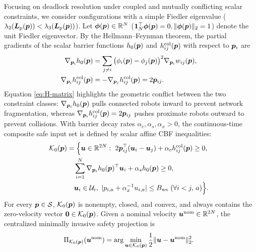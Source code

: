 Focusing on deadlock resolution under coupled and mutually conflicting scalar constraints, we consider configurations with a simple Fiedler eigenvalue ($\lambda_2(\boldsymbol{L}_{\mathrm{p}}(\boldsymbol{p}))<\lambda_3(\boldsymbol{L}_{\mathrm{p}}(\boldsymbol{p}))$). Let $\boldsymbol\phi(\boldsymbol{p})\in\mathbb R^N$ ($\boldsymbol 1_N^{\top}\boldsymbol\phi(\boldsymbol{p})=0,\lVert\boldsymbol\phi(\boldsymbol{p})\rVert_2=1$) denote the unit Fiedler eigenvector. By the Hellmann--Feynman theorem, the partial gradients of the scalar barrier functions $h_0(\boldsymbol{p})$ and $h_{ij}^{\mathrm{col}}(\boldsymbol{p})$ with respect to $\boldsymbol{p}_i$ are
\begin{equation}
\begin{split}
 \nabla_{\boldsymbol{p}_i}h_0(\boldsymbol{p})&=\sum_{j\ne i}\big(\phi_i(\boldsymbol{p})-\phi_j(\boldsymbol{p})\big)^2\nabla_{\boldsymbol{p}_i}w_{ij}(\boldsymbol{p}),\\
 \nabla_{\boldsymbol{p}_i}h_{ij}^{\mathrm{col}}(\boldsymbol{p})&=-\nabla_{\boldsymbol{p}_j}h_{ij}^{\mathrm{col}}(\boldsymbol{p})=2\boldsymbol{p}_{ij}.
\end{split}\label{eq:H-matrix}
\end{equation}
Equation \eqref{eq:H-matrix} highlights the geometric conflict between the two constraint classes: $\nabla_{\boldsymbol{p}_i}h_0(\boldsymbol{p})$ pulls connected robots inward to prevent network fragmentation, whereas $\nabla_{\boldsymbol{p}_i}h_{ij}^{\mathrm{col}}(\boldsymbol{p})=2\boldsymbol{p}_{ij}$ pushes proximate robots outward to prevent collisions. With barrier decay rates $\alpha_c,\alpha_s,\alpha_x>0$, the continuous-time composite safe input set is defined by scalar affine CBF inequalities:
\begin{equation}
\begin{split}
 \mathcal K_0(\bp)&=\Big\{\bu\in\mathbb R^{2N}:\ 2\bp_{ij}^{\top}(\bu_i-\bu_j)+\alpha_c h_{ij}^{\mathrm{col}}(\bp)\ge 0,\\
 &\quad \sum_{i=1}^N\nabla_{\bp_i}h_0(\bp)^{\top}\bu_i+\alpha_s h_0(\bp)\ge 0,\\
 &\quad \bu_i\in\mathcal U_i,\ |p_{i,a}+\alpha_x^{-1}u_{i,a}|\le B_{\mathrm{ws}}\ (\forall i<j,\,a)\Big\}.
\end{split}\label{eq:K0-def}
\end{equation}
For every $\boldsymbol{p}\in\mathcal S$, $\mathcal K_0(\boldsymbol{p})$ is nonempty, closed, and convex, and always contains the zero-velocity vector $\boldsymbol 0\in\mathcal K_0(\boldsymbol{p})$. Given a nominal velocity $\boldsymbol{u}^{\mathrm{nom}}\in\mathbb R^{2N}$, the centralized minimally invasive safety projection is
\begin{equation}
 \Pi_{\mathcal K_0(\boldsymbol{p})}(\boldsymbol{u}^{\mathrm{nom}})=\arg\min_{\boldsymbol{u}\in\mathcal K_0(\boldsymbol{p})}\frac12\lVert\boldsymbol{u}-\boldsymbol{u}^{\mathrm{nom}}\rVert_2^2.
 \label{eq:central-proj}
\end{equation}

